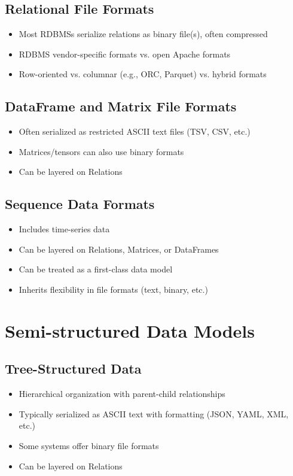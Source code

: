 \documentclass[12pt]{article}
\begin{document}
\subsection{Relational File Formats}
\begin{itemize}
    \item Most RDBMSs serialize relations as binary file(s), often compressed
    \item RDBMS vendor-specific formats vs. open Apache formats
    \item Row-oriented vs. columnar (e.g., ORC, Parquet) vs. hybrid formats
\end{itemize}

\subsection{DataFrame and Matrix File Formats}
\begin{itemize}
    \item Often serialized as restricted ASCII text files (TSV, CSV, etc.)
    \item Matrices/tensors can also use binary formats
    \item Can be layered on Relations
\end{itemize}

\subsection{Sequence Data Formats}
\begin{itemize}
    \item Includes time-series data
    \item Can be layered on Relations, Matrices, or DataFrames
    \item Can be treated as a first-class data model
    \item Inherits flexibility in file formats (text, binary, etc.)
\end{itemize}

\section{Semi-structured Data Models}

\subsection{Tree-Structured Data}
\begin{itemize}
    \item Hierarchical organization with parent-child relationships
    \item Typically serialized as ASCII text with formatting (JSON, YAML, XML, etc.)
    \item Some systems offer binary file formats
    \item Can be layered on Relations
\end{itemize}
\end{document}

